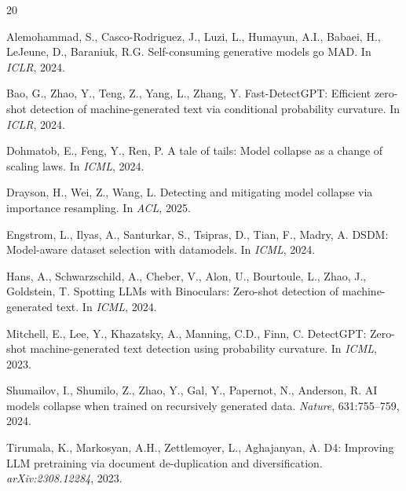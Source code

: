 \documentclass[11pt,a4paper]{article}
\begin{document}

\begin{thebibliography}{20}

Alemohammad, S., Casco-Rodriguez, J., Luzi, L., Humayun, A.I., Babaei, H., LeJeune, D., Baraniuk, R.G.
\newblock Self-consuming generative models go MAD.
\newblock In \emph{ICLR}, 2024.

Bao, G., Zhao, Y., Teng, Z., Yang, L., Zhang, Y.
\newblock Fast-DetectGPT: Efficient zero-shot detection of machine-generated text via conditional probability curvature.
\newblock In \emph{ICLR}, 2024.

Dohmatob, E., Feng, Y., Ren, P.
\newblock A tale of tails: Model collapse as a change of scaling laws.
\newblock In \emph{ICML}, 2024.

Drayson, H., Wei, Z., Wang, L.
\newblock Detecting and mitigating model collapse via importance resampling.
\newblock In \emph{ACL}, 2025.

Engstrom, L., Ilyas, A., Santurkar, S., Tsipras, D., Tian, F., Madry, A.
\newblock DSDM: Model-aware dataset selection with datamodels.
\newblock In \emph{ICML}, 2024.

Hans, A., Schwarzschild, A., Cheber, V., Alon, U., Bourtoule, L., Zhao, J., Goldstein, T.
\newblock Spotting LLMs with Binoculars: Zero-shot detection of machine-generated text.
\newblock In \emph{ICML}, 2024.

Mitchell, E., Lee, Y., Khazatsky, A., Manning, C.D., Finn, C.
\newblock DetectGPT: Zero-shot machine-generated text detection using probability curvature.
\newblock In \emph{ICML}, 2023.

Shumailov, I., Shumilo, Z., Zhao, Y., Gal, Y., Papernot, N., Anderson, R.
\newblock AI models collapse when trained on recursively generated data.
\newblock \emph{Nature}, 631:755--759, 2024.

Tirumala, K., Markosyan, A.H., Zettlemoyer, L., Aghajanyan, A.
\newblock D4: Improving LLM pretraining via document de-duplication and diversification.
\newblock \emph{arXiv:2308.12284}, 2023.


\end{thebibliography}
\end{document}

